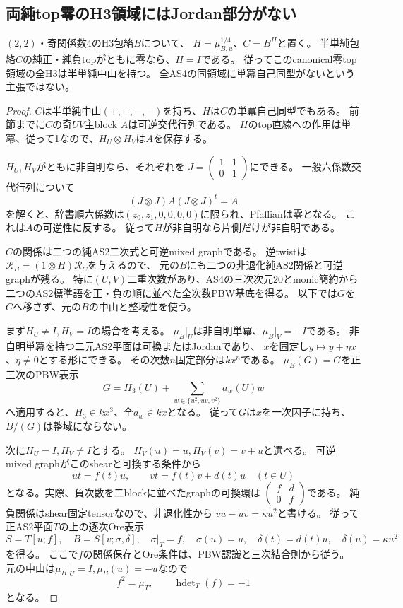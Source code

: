 \subsection{両純top零のH3領域にはJordan部分がない}
\label{subsec:h3-order2-22-rank4-zero-top-unipotent}
\begin{theorem}\label{thm:h3-order2-22-rank4-zero-top-no-Jordan}
$(2,2)$・奇関係数4のH3包絡$B$について、
$H=\mu_{B,u}^{1/4}$、$C=B^H$と置く。
半単純包絡$C$の純正・純負topがともに零なら、$H=I$である。
従ってこのcanonical零top領域の全H3は半単純中山を持つ。
全AS4の同領域に単冪自己同型がないという主張ではない。
\end{theorem}
\begin{proof}
$C$は半単純中山$(+,+,-,-)$を持ち、$H$は$C$の単冪自己同型でもある。
前節までに$C$の奇$UV$主block $A$は可逆交代行列である。
$H$のtop直線への作用は単冪、従って1なので、$H_U\otimes H_V$は$A$を保存する。

$H_U,H_V$がともに非自明なら、それぞれを
$J=\left(\begin{smallmatrix}1&1\\0&1\end{smallmatrix}\right)$にできる。
一般六係数交代行列について
\[
 (J\otimes J)A(J\otimes J)^t=A
\]
を解くと、辞書順六係数は$(z_0,z_1,0,0,0,0)$に限られ、Pfaffianは零となる。
これは$A$の可逆性に反する。
従って$H$が非自明なら片側だけが非自明である。

$C$の関係は二つの純AS2二次式と可逆mixed graphである。
逆twistは$\mathcal R_B=(1\otimes H)\mathcal R_C$を与えるので、
元の$B$にも二つの非退化純AS2関係と可逆graphが残る。
特に$(U,V)$二重次数があり、AS4の三次次元20とmonic簡約から
二つのAS2標準語を正・負の順に並べた全次数PBW基底を得る。
以下では$G$を$C$へ移さず、元の$B$の中山と整域性を使う。

まず$H_U\ne I,H_V=I$の場合を考える。
$\mu_B|_U$は非自明単冪、$\mu_B|_V=-I$である。
非自明単冪を持つ二元AS2平面は可換またはJordanであり、
$x$を固定し$y\mapsto y+\eta x$、$\eta\ne0$とする形にできる。
その次数$n$固定部分は$kx^n$である。
$\mu_B(G)=G$を正三次のPBW表示
\[
 G=H_3(U)+\sum_{w\in\{u^2,uv,v^2\}}a_w(U)w
\]
へ適用すると、$H_3\in kx^3$、全$a_w\in kx$となる。
従って$G$は$x$を一次因子に持ち、$B/(G)$は整域にならない。

次に$H_U=I,H_V\ne I$とする。
$H_V(u)=u,H_V(v)=v+u$と選べる。
可逆mixed graphがこのshearと可換する条件から
\[
 ut=f(t)u,\qquad vt=f(t)v+d(t)u\quad(t\in U)
\]
となる。実際、負次数を二blockに並べたgraphの可換環は
$\left(\begin{smallmatrix}f&d\\0&f\end{smallmatrix}\right)$である。
純負関係はshear固定tensorなので、非退化性から
$vu-uv=\kappa u^2$と書ける。
従って正AS2平面$T$の上の逐次Ore表示
\[
 S=T[u;f],\quad B=S[v;\sigma,\delta],\quad
 \sigma|_T=f,\quad\sigma(u)=u,\quad
 \delta(t)=d(t)u,\quad\delta(u)=\kappa u^2
\]
を得る。
ここで$f$の関係保存とOre条件は、PBW認識と三次結合則から従う。
元の中山は$\mu_B|_U=I,\mu_B(u)=-u$なので
\[
 f^2=\mu_T,\qquad\operatorname{hdet}_T(f)=-1
\]
となる。


\end{proof}
